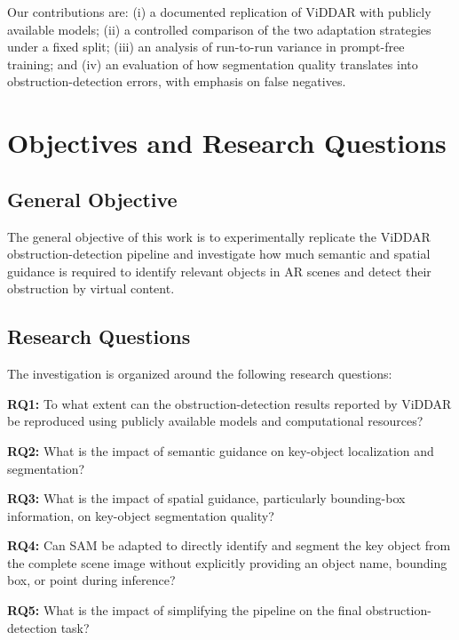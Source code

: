 \documentclass[conference]{IEEEtran}
\begin{document}
Our contributions are: (i) a documented replication of ViDDAR with publicly available models; (ii) a controlled comparison of the two adaptation strategies under a fixed split; (iii) an analysis of run-to-run variance in prompt-free training; and (iv) an evaluation of how segmentation quality translates into obstruction-detection errors, with emphasis on false negatives.


\section{Objectives and Research Questions}

\subsection{General Objective}

The general objective of this work is to experimentally replicate the ViDDAR obstruction-detection pipeline and investigate how much semantic and spatial guidance is required to identify relevant objects in AR scenes and detect their obstruction by virtual content.

\subsection{Research Questions}

The investigation is organized around the following research questions:

\textbf{RQ1:} To what extent can the obstruction-detection results reported by ViDDAR be reproduced using publicly available models and computational resources?

\textbf{RQ2:} What is the impact of semantic guidance on key-object localization and segmentation?

\textbf{RQ3:} What is the impact of spatial guidance, particularly bounding-box information, on key-object segmentation quality?

\textbf{RQ4:} Can SAM be adapted to directly identify and segment the key object from the complete scene image without explicitly providing an object name, bounding box, or point during inference?

\textbf{RQ5:} What is the impact of simplifying the pipeline on the final obstruction-detection task?
\end{document}

